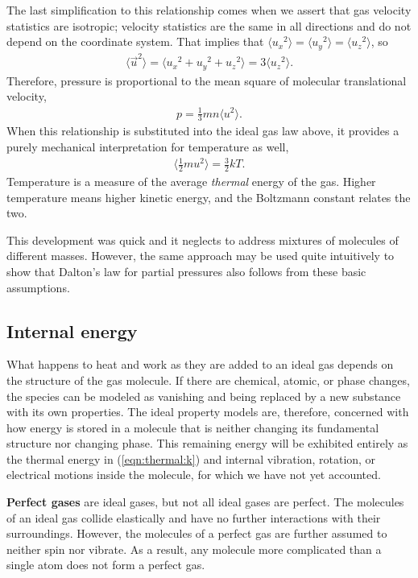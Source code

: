 The last simplification to this relationship comes when we assert that gas velocity statistics are isotropic; velocity statistics are the same in all directions and do not depend on the coordinate system.  That implies that $\langle u_x{^2} \rangle = \langle u_y{^2} \rangle = \langle u_z{^2} \rangle$, so
\begin{align}
\langle \vec{u}^2\rangle = \langle u_x{^2} + u_y{^2} + u_z{^2} \rangle = 3 \langle u_z{^2} \rangle.\label{eqn:ig:3dof}
\end{align}
Therefore, pressure is proportional to the mean square of molecular translational velocity,
\begin{align}
p = \frac{1}{3} m n \langle u{^2} \rangle.
\end{align}
When this relationship is substituted into the ideal gas law above, it provides a purely mechanical interpretation for temperature as well,
\begin{align}
\langle \frac{1}{2} m u{^2} \rangle = \frac{3}{2} k T.\label{eqn:thermal:k}
\end{align}
Temperature is a measure of the average \emph{thermal} energy of the gas.  Higher temperature means higher kinetic energy, and the Boltzmann constant relates the two.

This development was quick and it neglects to address mixtures of molecules of different masses.  However, the same approach may be used quite intuitively to show that Dalton's law for partial pressures also follows from these basic assumptions.

\subsection{Internal energy}\label{sec:ig:e}

What happens to heat and work as they are added to an ideal gas depends on the structure of the gas molecule.  If there are chemical, atomic, or phase changes, the species can be modeled as vanishing and being replaced by a new substance with its own properties.  The ideal property models are, therefore, concerned with how energy is stored in a molecule that is neither changing its fundamental structure nor changing phase.  This remaining energy will be exhibited entirely as the thermal energy in (\ref{eqn:thermal:k}) and internal vibration, rotation, or electrical motions inside the molecule, for which we have not yet accounted.

{\bf Perfect gases} are ideal gases, but not all ideal gases are perfect.  The molecules of an ideal gas collide elastically and have no further interactions with their surroundings.  However, the molecules of a perfect gas are further assumed to neither spin nor vibrate.  As a result, any molecule more complicated than a single atom does not form a perfect gas.

